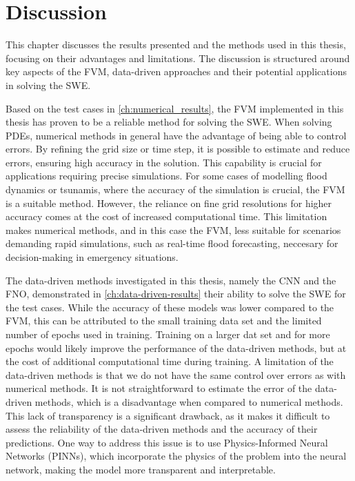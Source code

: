 \chapter{Discussion}\label{ch:discussion}
This chapter discusses the results presented and the methods used in this thesis, focusing on their advantages and limitations.
The discussion is structured around key aspects of the FVM, data-driven approaches and their potential applications in solving the SWE.

Based on the test cases in \autoref{ch:numerical_results}, the FVM implemented in this thesis has proven to be a reliable method for solving the SWE.
When solving PDEs, numerical methods in general have the advantage of being able to control errors.
By refining the grid size or time step, it is possible to estimate and reduce errors, ensuring high accuracy in the solution.
This capability is crucial for applications requiring precise simulations.
For some cases of modelling flood dynamics or tsunamis, where the accuracy of the simulation is crucial, the FVM is a suitable method.
However, the reliance on fine grid resolutions for higher accuracy comes at the cost of increased computational time.
This limitation makes numerical methods, and in this case the FVM, less suitable for scenarios demanding rapid simulations, such as real-time flood forecasting, neccesary for decision-making in emergency situations.

The data-driven methods investigated in this thesis, namely the CNN and the FNO, demonstrated in \autoref{ch:data-driven-results} their ability to solve the SWE for the test cases.
While the accuracy of these models was lower compared to the FVM, this can be attributed to the small training data set and the limited number of epochs used in training.
Training on a larger dat set and for more epochs would likely improve the performance of the data-driven methods, but at the cost of additional computational time during training.
A limitation of the data-driven methods is that we do not have the same control over errors as with numerical methods.
It is not straightforward to estimate the error of the data-driven methods, which is a disadvantage when compared to numerical methods.
This lack of transparency is a significant drawback, as it makes it difficult to assess the reliability of the data-driven methods and the accuracy of their predictions.
One way to address this issue is to use Physics-Informed Neural Networks (PINNs), which incorporate the physics of the problem into the neural network, making the model more transparent and interpretable.

